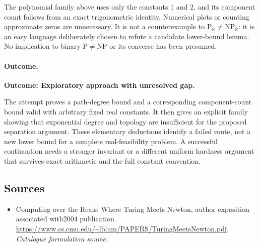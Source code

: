 \documentclass[11pt,a4paper]{article}
\newcommand{\R}{\mathbb{R}}
\numberwithin{equation}{section}
\begin{document}
The polynomial family above uses only the constants $1$ and $2$, and its
component count follows from an exact trigonometric identity. Numerical
plots or counting approximate zeros are unnecessary. It is not a
counterexample to $\mathrm P_{\R}\ne\mathrm{NP}_{\R}$: it is an easy
language deliberately chosen to refute a candidate lower-bound lemma.
No implication to binary $\mathrm P\ne\mathrm{NP}$ or its converse has
been presumed.

\paragraph{Outcome.}
\textbf{Outcome: Exploratory approach with unresolved gap.}

The attempt proves a path-degree bound and a corresponding component-count
bound valid with arbitrary fixed real constants. It then gives an explicit
family showing that exponential degree and topology are insufficient for
the proposed separation argument. These elementary deductions identify a
failed route, not a new lower bound for a complete real-feasibility problem.
A successful continuation needs a stronger invariant or a different
uniform hardness argument that survives exact arithmetic and the full
constant convention.
\subsection{Sources}
\begin{itemize}\raggedright
\item[\textnormal{[S1]}]\hypertarget{source:statement:1}{} Computing over the Reals: Where Turing Meets Newton, author exposition associated with2004 publication.
\url{https://www.cs.cmu.edu/~lblum/PAPERS/TuringMeetsNewton.pdf}.
{\small\textit{Catalogue formulation source.}}
\end{itemize}
\end{document}
